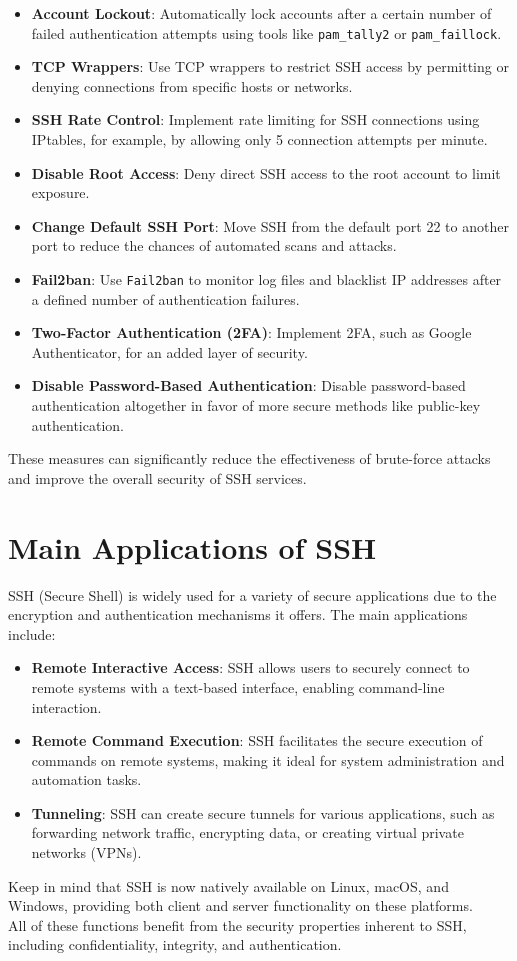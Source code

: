 \begin{itemize}
    \item \textbf{Account Lockout}: Automatically lock accounts after a
      certain number of failed authentication attempts using tools
      like \texttt{pam\_tally2} or \texttt{pam\_faillock}.
    \item \textbf{TCP Wrappers}: Use TCP wrappers to restrict SSH access by
      permitting or denying connections from specific hosts or
      networks.
    \item \textbf{SSH Rate Control}: Implement rate limiting for SSH
      connections using IPtables, for example, by allowing only 5
      connection attempts per minute.
    \item \textbf{Disable Root Access}: Deny direct SSH access to the root
      account to limit exposure.
    \item \textbf{Change Default SSH Port}: Move SSH from the default port
      22 to another port to reduce the chances of automated scans and
      attacks.
    \item \textbf{Fail2ban}: Use \texttt{Fail2ban} to monitor log files and
      blacklist IP addresses after a defined number of authentication
      failures.
    \item \textbf{Two-Factor Authentication (2FA)}: Implement 2FA, such as
      Google Authenticator, for an added layer of security.
    \item \textbf{Disable Password-Based Authentication}: Disable
      password-based authentication altogether in favor of more secure
      methods like public-key authentication.
\end{itemize}

These measures can significantly reduce the effectiveness of
brute-force attacks and improve the overall security of SSH services.
\section{Main Applications of SSH}

SSH (Secure Shell) is widely used for a variety of secure applications
due to the encryption and authentication mechanisms it offers. The
main applications include:

\begin{itemize}
    \item \textbf{Remote Interactive Access}: SSH allows users to securely
      connect to remote systems with a text-based interface, enabling
      command-line interaction.
    \item \textbf{Remote Command Execution}: SSH facilitates the secure
      execution of commands on remote systems, making it ideal for
      system administration and automation tasks.
    \item \textbf{Tunneling}: SSH can create secure tunnels for various
      applications, such as forwarding network traffic, encrypting
      data, or creating virtual private networks (VPNs).
\end{itemize}

Keep in mind that SSH is now natively available on Linux, macOS, and
Windows, providing both client and server functionality on these
platforms.\\
All of these functions benefit from the security properties inherent
to SSH, including confidentiality, integrity, and authentication.


